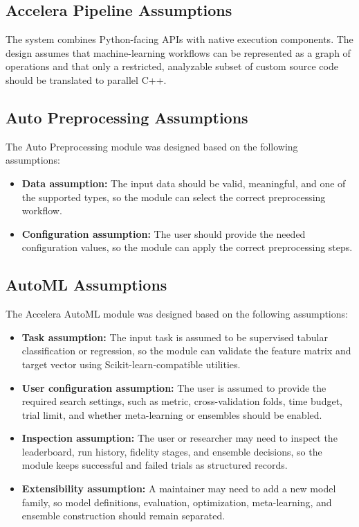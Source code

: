 \documentclass[12pt,a4paper]{report}
\begin{document}
\subsection{Accelera Pipeline Assumptions}
The system combines Python-facing APIs with native execution components. The
design assumes that machine-learning workflows can be represented as a graph
of operations and that only a restricted, analyzable subset of custom source
code should be translated to parallel C++.
\subsection{Auto Preprocessing Assumptions}

The Auto Preprocessing module was designed based on the following assumptions:

\begin{itemize}
  \item \textbf{Data assumption:} The input data should be valid, meaningful,
  and one of the supported types, so the module can select the correct
  preprocessing workflow.

  \item \textbf{Configuration assumption:} The user should provide the needed
  configuration values, so the module can apply the correct preprocessing steps.
\end{itemize}
\subsection{AutoML Assumptions}

The Accelera AutoML module was designed based on the following
assumptions:

\begin{itemize}
  \item \textbf{Task assumption:} The input task is assumed to be supervised
  tabular classification or regression, so the module can validate the feature
  matrix and target vector using Scikit-learn-compatible utilities.

  \item \textbf{User configuration assumption:} The user is assumed to provide
  the required search settings, such as metric, cross-validation folds,
  time budget, trial limit, and whether meta-learning or ensembles should be
  enabled.

  \item \textbf{Inspection assumption:} The user or researcher may need to
  inspect the leaderboard, run history, fidelity stages, and ensemble decisions,
  so the module keeps successful and failed trials as structured records.

  \item \textbf{Extensibility assumption:} A maintainer may need to add a new
  model family, so model definitions, evaluation, optimization, meta-learning,
  and ensemble construction should remain separated.
\end{itemize}
\end{document}
